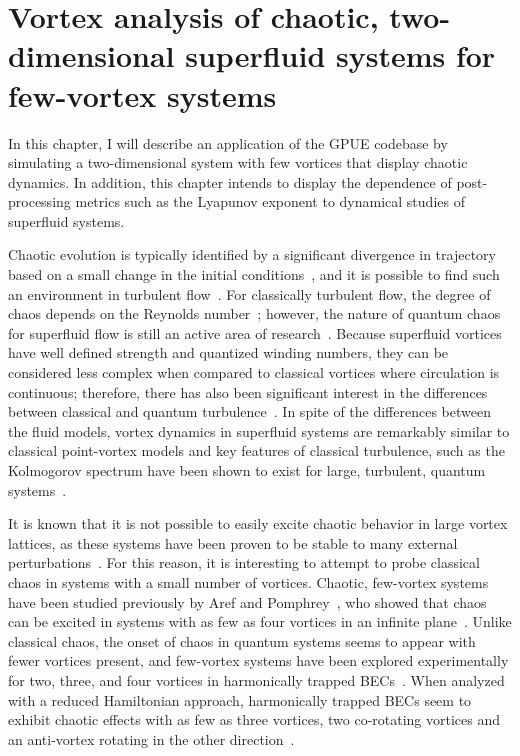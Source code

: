\chapter{Vortex analysis of chaotic, two-dimensional superfluid systems for few-vortex systems}
\label{ch:2d}

In this chapter, I will describe an application of the GPUE codebase by simulating a two-dimensional system with few vortices that display chaotic dynamics.
In addition, this chapter intends to display the dependence of post-processing metrics such as the Lyapunov exponent to dynamical studies of superfluid systems.

Chaotic evolution is typically identified by a significant divergence in trajectory based on a small change in the initial conditions~\cite{strogatz2018}, and it is possible to find such an environment in turbulent flow~\cite{spiegel1987, biferale2005}.
For classically turbulent flow, the degree of chaos depends on the Reynolds number~\cite{berera2018}; however, the nature of quantum chaos for superfluid flow is still an active area of research~\cite{white2014}.
Because superfluid vortices have well defined strength and quantized winding numbers, they can be considered less complex when compared to classical vortices where circulation is continuous; therefore, there has also been significant interest in the differences between classical and quantum turbulence~\cite{nemirovskii1995,kyriakopoulos2014,koukouloyannis2014,navarro2013}.
In spite of the differences between the fluid models, vortex dynamics in superfluid systems are remarkably similar to classical point-vortex models and key features of classical turbulence, such as the Kolmogorov spectrum have been shown to exist for large, turbulent, quantum systems~\cite{nore1997,stalp1999,araki2002,salort2010}.

It is known that it is not possible to easily excite chaotic behavior in large vortex lattices, as these systems have been proven to be stable to many external perturbations~\cite{o2017}.
For this reason, it is interesting to attempt to probe classical chaos in systems with a small number of vortices.
Chaotic, few-vortex systems have been studied previously by Aref and Pomphrey~\cite{aref1982, aref1980, aref1983}, who showed that chaos can be excited in systems with as few as four vortices in an infinite plane~\cite{aref1982}.
Unlike classical chaos, the onset of chaos in quantum systems seems to appear with fewer vortices present, and few-vortex systems have been explored experimentally for two, three, and four vortices in harmonically trapped BECs~\cite{navarro2013}.
When analyzed with a reduced Hamiltonian approach, harmonically trapped BECs seem to exhibit chaotic effects with as few as three vortices, two co-rotating vortices and an anti-vortex rotating in the other direction~\cite{kyriakopoulos2014,koukouloyannis2014}.

